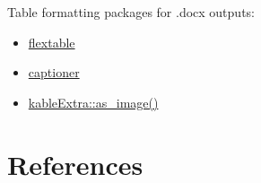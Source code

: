 \documentclass[
  12pt,
  oneside]{book}
\providecommand{\tightlist}{%
  \setlength{\itemsep}{0pt}\setlength{\parskip}{0pt}}
\numberwithin{figure}{chapter}
\begin{document}
Table formatting packages for .docx outputs:

\begin{itemize}
\tightlist
\item
  \href{https://cran.r-project.org/web/packages/flextable/vignettes/overview.html}{flextable}
\item
  \href{https://cran.r-project.org/web/packages/captioner/vignettes/using_captioner.html}{captioner}
\item
  \href{https://haozhu233.github.io/kableExtra/save_kable_and_as_image.html}{kableExtra::as\_image()}
\end{itemize}

\hypertarget{references}{%
\chapter{References}\label{references}}

\backmatter
\end{document}

